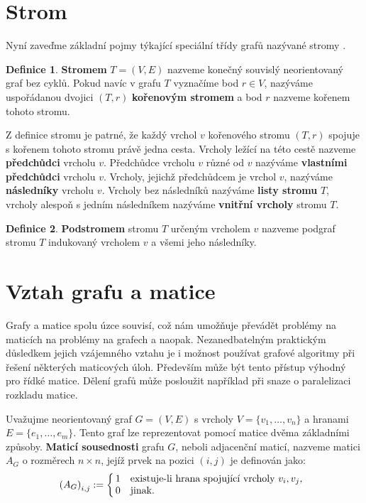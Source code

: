\documentclass{ctuthesis}
\theoremstyle{plain}
\theoremstyle{definition}
\newtheorem{definition}{Definice}
\begin{document}
\section{Strom}

Nyní zaveďme základní pojmy týkající speciální třídy grafů nazývané stromy \cite{koub:11}.

\begin{definition}
  \textbf{Stromem} $T=(V,E)$ nazveme konečný souvislý neorientovaný graf bez cyklů. Pokud navíc v grafu $T$ vyznačíme bod $r \in V$, nazýváme uspořádanou dvojici $(T,r)$ \textbf{kořenovým stromem} a bod $r$ nazveme kořenem tohoto stromu.
\end{definition}

Z definice stromu je patrné, že každý vrchol $v$ kořenového stromu $(T,r)$ spojuje s kořenem tohoto stromu právě jedna cesta.
Vrcholy ležící na této cestě nazveme \textbf{předchůdci} vrcholu $v$. Předchůdce vrcholu $v$ různé od $v$ nazýváme \textbf{vlastními předchůdci} vrcholu $v$. Vrcholy, jejichž předchůdcem je vrchol $v$, nazýváme \textbf{následníky} vrcholu $v$. Vrcholy bez následníků nazýváme \textbf{listy stromu} $T$, vrcholy alespoň s jedním následníkem nazýváme \textbf{vnitřní vrcholy} stromu $T$.

\begin{definition}
  \textbf{Podstromem} stromu $T$ určeným vrcholem $v$ nazveme podgraf stromu $T$ indukovaný vrcholem $v$ a všemi jeho následníky.
\end{definition}

\section{Vztah grafu a matice}
\label{GrMatRel}
Grafy a matice spolu úzce souvisí, což nám umožňuje převádět problémy na maticích na problémy na grafech a naopak. Nezanedbatelným praktickým důsledkem jejich vzájemného vztahu je i možnost používat grafové algoritmy při řešení některých maticových úloh. Především může být tento přístup výhodný pro řídké matice. Dělení grafů může posloužit například při snaze o paralelizaci rozkladu matice.

Uvažujme neorientovaný graf $G=(V,E)$ s vrcholy $V = \{v_1, \ldots, v_n\}$ a hranami $E = \{e_1, \ldots, e_m\}$. Tento graf lze reprezentovat pomocí matice dvěma základními způsoby. \textbf{Maticí sousednosti} grafu $G$, neboli adjacenční maticí, nazveme matici $A_G$ o rozměrech $n \times n$, jejíž prvek na pozici $(i,j)$ je definován jako:
\[
  {(A_G)}_{i,j} :=
  \left\{
    \begin{array}{@{\,}ll}
      1  & \mbox{existuje-li hrana spojující vrcholy $v_i, v_j$,} \\
      0  & \mbox{jinak.}
    \end{array}
  \right.
\]
\end{document}
